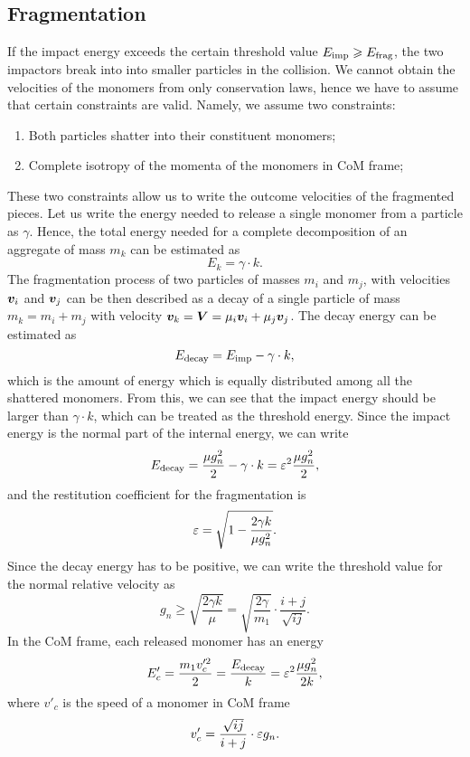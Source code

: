 \documentclass[aps,prl,preprint,groupedaddress,10pt]{revtex4-2}
\begin{document}
\subsection{Fragmentation}
If the impact energy exceeds the certain threshold value 
$E_{\mathrm{imp}}\geqslant E_{\mathrm{frag}}$, the two impactors break into into smaller
particles in the collision.
We cannot obtain the velocities of the monomers from only conservation laws, hence 
we have to assume that certain constraints are valid. Namely, we assume two 
constraints:
\begin{enumerate}
    \item Both particles shatter into their constituent monomers;
    \item Complete isotropy of the momenta of the monomers in CoM frame;
\end{enumerate}
These two constraints allow us to write the outcome velocities of the fragmented pieces.
Let us write the energy needed to release a single monomer from a particle as $\gamma$.
Hence, the total energy needed for a complete decomposition of an aggregate of mass $m_k$
can be estimated as
\begin{equation}
    E_k = \gamma\cdot k.
\end{equation}
The fragmentation process of two particles of masses $m_i$ and $m_j$, with velocities
$\vb*{v}_i$ and $\vb*{v}_j$ can be then described as a decay of a single particle of mass 
$m_k=m_i+m_j$ with velocity $\vb*{v}_k=\vb*{V}=\mu_i\vb*{v}_i+\mu_j\vb*{v}_j$. The decay energy can 
be estimated as 
\begin{equation}
    E_{\mathrm{decay}}=E_{\mathrm{imp}}-\gamma\cdot k,
\end{equation}
which is the amount of energy which is equally distributed among all the shattered 
monomers. From this, we can see that the impact energy should be larger than 
$\gamma\cdot k$, which can be treated as the threshold energy. Since the impact energy 
is the normal part of the internal energy, we can write
\begin{equation}
    E_{\mathrm{decay}}=\frac{\mu g_n^2}{2}-\gamma\cdot k=\varepsilon^2\frac{\mu g_n^2}{2},
\end{equation}
and the restitution coefficient for the fragmentation is
\begin{equation}
    \varepsilon=\sqrt{1-\frac{2\gamma k}{\mu g_n^2}}.
\end{equation}
Since the decay energy has to be positive, we can write the threshold value for the 
normal relative velocity as 
\begin{equation}
    g_n\geqslant\sqrt{\frac{2\gamma k}{\mu}}=
    \sqrt{\frac{2\gamma}{m_1}}\cdot\frac{i+j}{\sqrt{ij}}.
\end{equation}
In the CoM frame, each released monomer has an energy 
\begin{equation}
    E'_{c}=\frac{m_1v'^2_{c}}{2}=\frac{E_{\mathrm{decay}}}{k}=\varepsilon^2\frac{\mu g_n^2}{2k},
\end{equation}
where $v'_{c}$ is the speed of a monomer in CoM frame
\begin{equation}
    v'_{c}=\frac{\sqrt{ij}}{i+j}\cdot\varepsilon g_n.
\end{equation}
\end{document}
